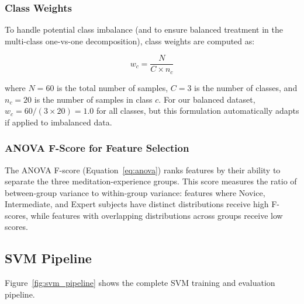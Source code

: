\documentclass[12pt,a4paper]{article}
\begin{document}
\subsubsection{Class Weights}

To handle potential class imbalance (and to ensure balanced treatment in the multi-class one-vs-one decomposition), class weights are computed as:

\begin{equation}
w_c = \frac{N}{C \times n_c}
\label{eq:class_weight}
\end{equation}

where $N = 60$ is the total number of samples, $C = 3$ is the number of classes, and $n_c = 20$ is the number of samples in class $c$. For our balanced dataset, $w_c = 60 / (3 \times 20) = 1.0$ for all classes, but this formulation automatically adapts if applied to imbalanced data.

\subsubsection{ANOVA F-Score for Feature Selection}

The ANOVA F-score (Equation~\ref{eq:anova}) ranks features by their ability to separate the three meditation-experience groups. This score measures the ratio of between-group variance to within-group variance: features where Novice, Intermediate, and Expert subjects have distinct distributions receive high F-scores, while features with overlapping distributions across groups receive low scores.

\subsection{SVM Pipeline}

Figure~\ref{fig:svm_pipeline} shows the complete SVM training and evaluation pipeline.
\end{document}
